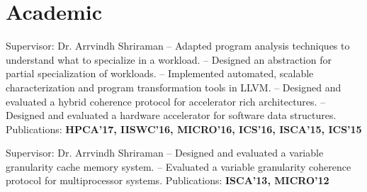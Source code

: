 
\section{Academic}
{Supervisor: Dr. Arrvindh Shriraman \newline{} 
-- Adapted program analysis techniques to understand what to specialize in a workload. \newline{}
-- Designed an abstraction for partial specialization of workloads. \newline{}
-- Implemented automated, scalable characterization and program transformation tools in LLVM. \newline{}
-- Designed and evaluated a hybrid coherence protocol for accelerator rich architectures. \newline{}
-- Designed and evaluated a hardware accelerator for software data structures. \newline{}
Publications: \textbf{HPCA'17, IISWC'16, MICRO'16, ICS'16, ISCA'15, ICS'15}}

\vspace{9pt}

{Supervisor: Dr. Arrvindh Shriraman \newline{} 
-- Designed and evaluated a variable granularity cache memory system. \newline{}
-- Evaluated a variable granularity coherence protocol for multiprocessor systems. \newline{}
Publications: \textbf{ISCA'13, MICRO'12}}

\vspace{9pt}



